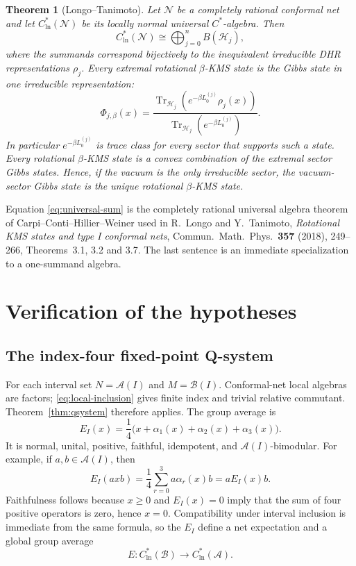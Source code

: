 \documentclass[11pt]{article}
\newtheorem{theorem}{Theorem}[section]
\theoremstyle{remark}
\newcommand{\A}{\mathcal A}
\newcommand{\B}{\mathcal B}
\newcommand{\Hh}{\mathcal H}
\newcommand{\Tr}{\operatorname{Tr}}
\begin{document}
\begin{theorem}[Longo--Tanimoto]
\label{thm:lt}
Let $\mathcal N$ be a completely rational conformal net and let
$C^*_{\mathrm{ln}}(\mathcal N)$ be its locally normal universal
$C^*$-algebra.  Then
\[
 C^*_{\mathrm{ln}}(\mathcal N)
 \cong\bigoplus_{j=0}^{n}B(\Hh_j),
\tag{2.9}\label{eq:universal-sum}
\]
where the summands correspond bijectively to the inequivalent
irreducible DHR representations $\rho_j$.  Every extremal rotational
$\beta$-KMS state is the Gibbs state in one irreducible
representation:
\[
 \Phi_{j,\beta}(x)
 =\frac{\Tr_{\Hh_j}(e^{-\beta L_0^{(j)}}\rho_j(x))}
 {\Tr_{\Hh_j}(e^{-\beta L_0^{(j)}})}.
\tag{2.10}\label{eq:sector-gibbs}
\]
In particular $e^{-\beta L_0^{(j)}}$ is trace class for every sector
that supports such a state.  Every rotational $\beta$-KMS state is a
convex combination of the extremal sector Gibbs states.  Hence, if
the vacuum is the only irreducible sector, the vacuum-sector Gibbs
state is the unique rotational $\beta$-KMS state.
\end{theorem}

Equation \eqref{eq:universal-sum} is the completely rational universal
algebra theorem of Carpi--Conti--Hillier--Weiner used in
R.~Longo and Y.~Tanimoto, \emph{Rotational KMS states and type I
conformal nets}, Commun.\ Math.\ Phys.\ \textbf{357} (2018),
249--266, Theorems~3.1, 3.2 and 3.7.  The last sentence is an
immediate specialization to a one-summand algebra.

\section{Verification of the hypotheses}

\subsection{The index-four fixed-point Q-system}

For each interval set $N=\A(I)$ and $M=\B(I)$.  Conformal-net local
algebras are factors; \eqref{eq:local-inclusion} gives finite index
and trivial relative commutant.  Theorem~\ref{thm:qsystem} therefore
applies.  The group average is
\[
 E_I(x)=\frac14\bigl(x+\alpha_1(x)+\alpha_2(x)+\alpha_3(x)\bigr).
\tag{3.1}\label{eq:EI}
\]
It is normal, unital, positive, faithful, idempotent, and
$\A(I)$-bimodular.  For example, if $a,b\in\A(I)$, then
\[
 E_I(axb)=\frac14\sum_{r=0}^{3}a\alpha_r(x)b
 =aE_I(x)b.
\tag{3.2}\label{eq:bimodule}
\]
Faithfulness follows because $x\geq0$ and $E_I(x)=0$ imply that the
sum of four positive operators is zero, hence $x=0$.  Compatibility
under interval inclusion is immediate from the same formula, so the
$E_I$ define a net expectation and a global group average
\[
 E:C^*_{\mathrm{ln}}(\B)\longrightarrow
 C^*_{\mathrm{ln}}(\A).
\tag{3.3}\label{eq:global-E}
\]
\end{document}

